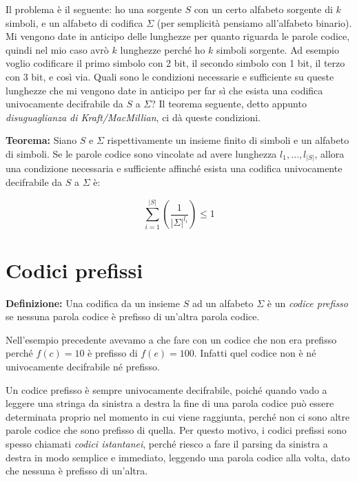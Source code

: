 \vspace{5mm}

Il problema è il seguente: ho una sorgente \(S\) con un certo alfabeto sorgente di \(k\) simboli, e un alfabeto di codifica \(\Sigma\) (per semplicità pensiamo all'alfabeto binario). Mi vengono date in anticipo delle lunghezze per quanto riguarda le parole codice, quindi nel mio caso avrò \(k\) lunghezze perché ho \(k\) simboli sorgente. Ad esempio voglio codificare il primo simbolo con 2 bit, il secondo simbolo con 1 bit, il terzo con 3 bit, e così via. Quali sono le condizioni necessarie e sufficiente su queste lunghezze che mi vengono date in anticipo per far sì che esista una codifica univocamente decifrabile da \(S\) a \(\Sigma\)? Il teorema seguente, detto appunto \textit{disuguaglianza di Kraft/MacMillian}, ci dà queste condizioni.

\vspace{5mm}

\textbf{Teorema:} Siano \(S\) e \(\Sigma\) rispettivamente un insieme finito di simboli e un alfabeto di simboli. Se le parole codice sono vincolate ad avere lunghezza \(l_1, \dots, l_{|S|}\), allora una condizione necessaria e sufficiente affinché esista una codifica univocamente decifrabile da \(S\) a \(\Sigma\) è:

\[\sum_{i=1}^{|S|} \left( \frac{1}{|\Sigma|^{l_i}} \right) \leq 1\]

\section{Codici prefissi}

\textbf{Definizione:} Una codifica da un insieme \(S\) ad un alfabeto \(\Sigma\) è un \textit{codice prefisso} se nessuna parola codice è prefisso di un'altra parola codice. 

\vspace{5mm}

Nell'esempio precedente avevamo a che fare con un codice che non era prefisso perché \(f(c) = 10\) è prefisso di \(f(e) = 100\). Infatti quel codice non è né univocamente decifrabile né prefisso.

Un codice prefisso è sempre univocamente decifrabile, poiché quando vado a leggere una stringa da sinistra a destra la fine di una parola codice può essere determinata proprio nel momento in cui viene raggiunta, perché non ci sono altre parole codice che sono prefisso di quella. Per questo motivo, i codici prefissi sono spesso chiamati \textit{codici istantanei}, perché riesco a fare il parsing da sinistra a destra in modo semplice e immediato, leggendo una parola codice alla volta, dato che nessuna è prefisso di un'altra. 

